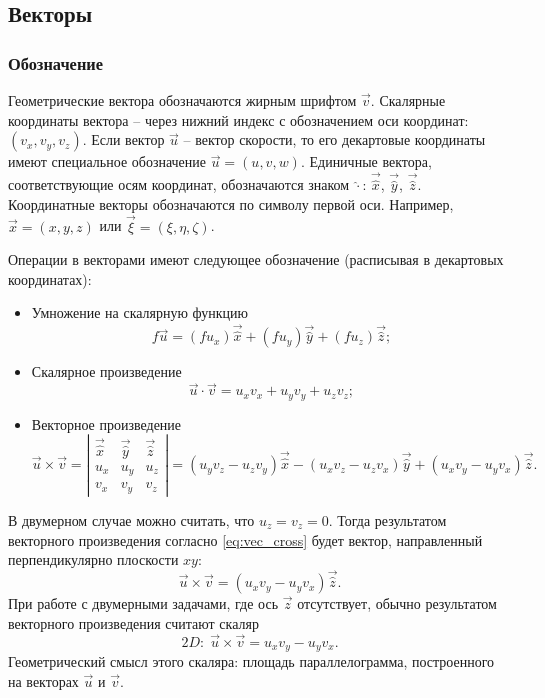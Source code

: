 \subsection{Векторы}

\subsubsection{Обозначение}

Геометрические вектора обозначаются жирным шрифтом $\vec v$.
Скалярные координаты вектора -- через нижний индекс с обозначением
оси координат: $\left(v_x, v_y, v_z\right)$.
Если вектор $\vec u$ -- вектор скорости, то его декартовые координаты
имеют специальное обозначение $\vec u = \left(u, v, w\right)$.
Единичные вектора, соответствующие осям координат, обозначаются 
знаком $\hat\cdot$: $\vec{\hat x}$, $\vec{\hat y}$, $\vec{\hat z}$.
Координатные векторы обозначаются по символу первой оси. Например, $\vec x = (x, y, z)$ или $\vec \xi = (\xi, \eta, \zeta)$.

Операции в векторами имеют следующее обозначение (расписывая в декартовых координатах):
\begin{itemize}
\item
Умножение на скалярную функцию
\begin{equation}
\label{eq:vec_scalar}
f \vec u = (f u_x)\vec{\hat x} + (f u_y)\vec{\hat y} + (f u_z)\vec{\hat z};
\end{equation}
\item
Скалярное произведение
\begin{equation}
\label{eq:vec_dot}
\vec u \cdot \vec v = u_x v_x + u_y v_y + u_z v_z;
\end{equation}
\item
Векторное произведение
\begin{equation}
\label{eq:vec_cross}
\vec u\times\vec v = 
\left|
\begin{array}{ccc}
\vec{\hat x} & \vec{\hat y} & \vec{\hat z} \\
u_x & u_y & u_z \\
v_x & v_y & v_z
\end{array}
\right| = 
\left(u_y v_z - u_z v_y\right)\vec{\hat x} -
\left(u_x v_z - u_z v_x\right)\vec{\hat y} +
\left(u_x v_y - u_y v_x\right)\vec{\hat z}.
\end{equation}

\end{itemize}

В двумерном случае можно считать, что $u_z = v_z = 0$.
Тогда результатом векторного произведения согласно \cref{eq:vec_cross} 
будет вектор, направленный перпендикулярно плоскости $xy$:
$$
\vec u \times \vec v = (u_x v_y - u_y v_x)\vec{\hat z}.
$$
При работе с двумерными задачами, где ось $\vec z$ отсутствует,
обычно результатом векторного произведения считают скаляр
\begin{equation}
\label{eq:vec_cross_2d}
2D: \; \vec u \times \vec v = u_x v_y - u_y v_x.
\end{equation}
Геометрический смысл этого скаляра: площадь
параллелограмма, построенного на векторах $\vec u$ и $\vec v$.


